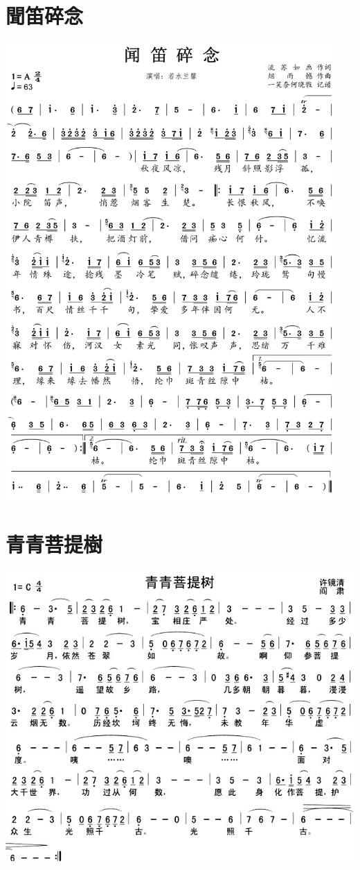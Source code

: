 \documentclass[cn,pad,twocol]{elegantbook}
\begin{document}
\section{聞笛碎念}
    \includegraphics[width=0.95\textwidth]{dongxiao/20201231-闻地碎念} 
\section{青青菩提樹}
    \includegraphics[width=\textwidth]{dongxiao/20201231-青青菩提树}
\end{document}
